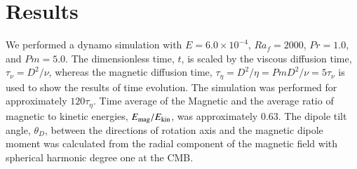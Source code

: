 \section{Results}
\label{section:results}

We performed a dynamo simulation with $E = 6.0 \times 10^{-4}$, $Ra_f = 2000$, $Pr = 1.0$, and $Pm = 5.0$. 
The dimensionless time, $t$, is scaled by the viscous diffusion time, $\tau_\nu = D^2 / \nu$, whereas the magnetic diffusion time, $\tau_\eta = D^2 / \eta = Pm D^2 / \nu = 5 \tau_\nu$ is used to show the results of time evolution.
The simulation was performed for approximately $120 \tau_\eta$. %
Time average of the Magnetic and the average ratio of magnetic to kinetic energies, $E_{\rm mag} / E_{\rm kin}$, was approximately 0.63. 
The dipole tilt angle, $\theta_D$, between the directions of rotation axis and the magnetic dipole moment was calculated from the radial component of the magnetic field with spherical harmonic degree one  at the CMB.




